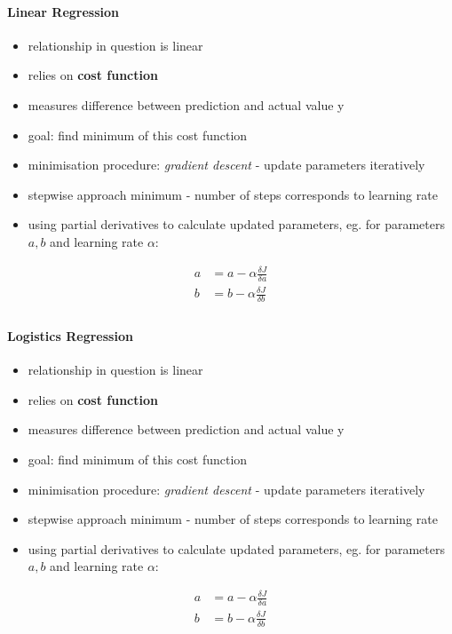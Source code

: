 \paragraph{Linear Regression}
\begin{itemize}
  \item relationship in question is linear
  \item relies on \textbf{cost function}
  \item measures difference between prediction and actual value y
  \item goal: find minimum of this cost function
  \item minimisation procedure: \emph{gradient descent} - update parameters iteratively
  \item stepwise approach minimum - number of steps corresponds to learning rate
  \item using partial derivatives to calculate updated parameters, eg. for parameters $a,b$ and learning rate $\alpha$:
\end{itemize}
\begin{align}
  a&=a-\alpha\frac{\delta J}{\delta a}\\
  b&=b-\alpha\frac{\delta J}{\delta b}\\
\end{align}
\paragraph{Logistics Regression}
\begin{itemize}
  \item relationship in question is linear
  \item relies on \textbf{cost function}
  \item measures difference between prediction and actual value y
  \item goal: find minimum of this cost function
  \item minimisation procedure: \emph{gradient descent} - update parameters iteratively
  \item stepwise approach minimum - number of steps corresponds to learning rate
  \item using partial derivatives to calculate updated parameters, eg. for parameters $a,b$ and learning rate $\alpha$:
\end{itemize}
\begin{align}
  a&=a-\alpha\frac{\delta J}{\delta a}\\
  b&=b-\alpha\frac{\delta J}{\delta b}\\
\end{align}


